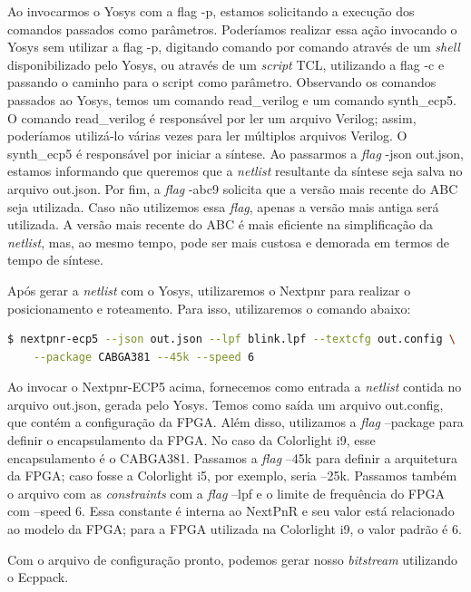 \documentclass{report}
\begin{document}
Ao invocarmos o Yosys com a flag -p, estamos solicitando a execução dos comandos passados como parâmetros. Poderíamos realizar essa ação invocando o Yosys sem utilizar a flag -p, digitando comando por comando através de um \textit{shell} disponibilizado pelo Yosys, ou através de um \textit{script} TCL, utilizando a flag -c e passando o caminho para o script como parâmetro. Observando os comandos passados ao Yosys, temos um comando read\_verilog e um comando synth\_ecp5. O comando read\_verilog é responsável por ler um arquivo Verilog; assim, poderíamos utilizá-lo várias vezes para ler múltiplos arquivos Verilog. O synth\_ecp5 é responsável por iniciar a síntese. Ao passarmos a \textit{flag} -json out.json, estamos informando que queremos que a \textit{netlist} resultante da síntese seja salva no arquivo out.json. Por fim, a \textit{flag} -abc9 solicita que a versão mais recente do ABC seja utilizada. Caso não utilizemos essa \textit{flag}, apenas a versão mais antiga será utilizada. A versão mais recente do ABC é mais eficiente na simplificação da \textit{netlist}, mas, ao mesmo tempo, pode ser mais custosa e demorada em termos de tempo de síntese.

Após gerar a \textit{netlist} com o Yosys, utilizaremos o Nextpnr para realizar o posicionamento e roteamento. Para isso, utilizaremos o comando abaixo:

\begin{lstlisting}[language=bash]
$ nextpnr-ecp5 --json out.json --lpf blink.lpf --textcfg out.config \
    --package CABGA381 --45k --speed 6
\end{lstlisting}

Ao invocar o Nextpnr-ECP5 acima, fornecemos como entrada a \textit{netlist} contida no arquivo out.json, gerada pelo Yosys. Temos como saída um arquivo out.config, que contém a configuração da FPGA. Além disso, utilizamos a \textit{flag} --package para definir o encapsulamento da FPGA. No caso da Colorlight i9, esse encapsulamento é o CABGA381. Passamos a \textit{flag} --45k para definir a arquitetura da FPGA; caso fosse a Colorlight i5, por exemplo, seria --25k. Passamos também o arquivo com as \textit{constraints} com a \textit{flag} --lpf e o limite de frequência do FPGA com --speed 6. Essa constante é interna ao NextPnR e seu valor está relacionado ao modelo da FPGA; para a FPGA utilizada na Colorlight i9, o valor padrão é 6.

Com o arquivo de configuração pronto, podemos gerar nosso \textit{bitstream} utilizando o Ecppack.
\end{document}
